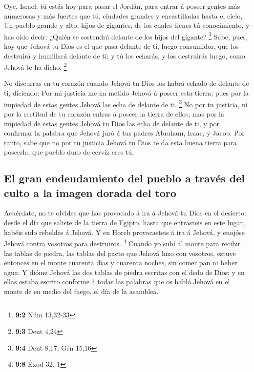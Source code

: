  Oye, Israel: tú estás hoy para pasar el Jordán, para
entrar á poseer gentes más numerosas y más fuertes que tú, ciudades
grandes y encastilladas hasta el cielo,  Un pueblo grande
y alto, hijos de gigantes, de los cuales tienes tú conocimiento, y has
oído decir: ¿Quién se sostendrá delante de los hijos del gigante?
\footnote{\textbf{9:2} Núm 13,32-33}  Sabe, pues, hoy que
Jehová tu Dios es el que pasa delante de ti, fuego consumidor, que los
destruirá y humillará delante de ti: y tú los echarás, y los destruirás
luego, como Jehová te ha dicho. \footnote{\textbf{9:3} Deut 4,24}

 No discurras en tu corazón cuando Jehová tu Dios los
habrá echado de delante de ti, diciendo: Por mi justicia me ha metido
Jehová á poseer esta tierra; pues por la impiedad de estas gentes Jehová
las echa de delante de ti. \footnote{\textbf{9:4} Deut 8,17; Gén 15,16}
 No por tu justicia, ni por la rectitud de tu corazón
entras á poseer la tierra de ellos; mas por la impiedad de estas gentes
Jehová tu Dios las echa de delante de ti, y por confirmar la palabra que
Jehová juró á tus padres Abraham, Isaac, y Jacob.  Por
tanto, sabe que no por tu justicia Jehová tu Dios te da esta buena
tierra para poseerla; que pueblo duro de cerviz eres tú.

\hypertarget{el-gran-endeudamiento-del-pueblo-a-travuxe9s-del-culto-a-la-imagen-dorada-del-toro}{%
\subsection{El gran endeudamiento del pueblo a través del culto a la
imagen dorada del
toro}\label{el-gran-endeudamiento-del-pueblo-a-travuxe9s-del-culto-a-la-imagen-dorada-del-toro}}

 Acuérdate, no te olvides que has provocado á ira á Jehová
tu Dios en el desierto: desde el día que saliste de la tierra de Egipto,
hasta que entrasteis en este lugar, habéis sido rebeldes á Jehová.
 Y en Horeb provocasteis á ira á Jehová, y enojóse Jehová
contra vosotros para destruiros. \footnote{\textbf{9:8} Éxod 32,-1}
 Cuando yo subí al monte para recibir las tablas de
piedra, las tablas del pacto que Jehová hizo con vosotros, estuve
entonces en el monte cuarenta días y cuarenta noches, sin comer pan ni
beber agua:  Y dióme Jehová las dos tablas de piedra
escritas con el dedo de Dios; y en ellas estaba escrito conforme á todas
las palabras que os habló Jehová en el monte de en medio del fuego, el
día de la asamblea.

